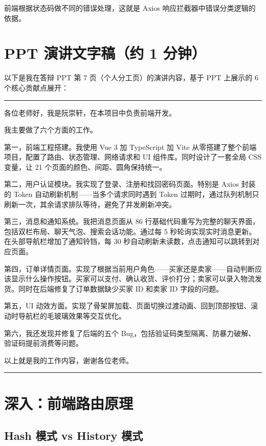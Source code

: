 \documentclass[12pt,a4paper]{ctexart}
\begin{document}
前端根据状态码做不同的错误处理，这就是 Axios 响应拦截器中错误分类逻辑的依据。

\section{PPT 演讲文字稿（约 1 分钟）}

以下是我在答辩 PPT 第 7 页（个人分工页）的演讲内容，基于 PPT 上展示的 6 个核心贡献点展开：

\medskip
\noindent\rule{\textwidth}{0.4pt}
\medskip

各位老师好，我是阮崇轩，在本项目中负责前端开发。

我主要做了六个方面的工作。

第一，前端工程搭建。我使用 Vue 3 加 TypeScript 加 Vite 从零搭建了整个前端项目，配置了路由、状态管理、网络请求和 UI 组件库。同时设计了一套全局 CSS 变量，让 21 个页面的颜色、间距、圆角保持统一。

第二，用户认证模块。我实现了登录、注册和找回密码页面。特别是 Axios 封装的 Token 自动刷新机制——当多个请求同时遇到 Token 过期时，通过队列机制只刷新一次，其余请求排队等待，避免了并发刷新冲突。

第三，消息和通知系统。我把消息页面从 86 行基础代码重写为完整的聊天界面，包括双栏布局、聊天气泡、搜索会话功能。通过每 5 秒轮询实现实时消息更新。在头部导航栏增加了通知铃铛，每 30 秒自动刷新未读数，点击通知可以跳转到对应页面。

第四，订单详情页面。实现了根据当前用户角色——买家还是卖家——自动判断应该显示什么操作按钮。买家可以支付、确认收货、评价打分；卖家可以录入物流发货。同时在后端修复了订单数据缺少买家 ID 和卖家 ID 字段的问题。

第五，UI 动效方面。实现了骨架屏加载、页面切换过渡动画、回到顶部按钮、滚动时导航栏的毛玻璃效果等交互优化。

第六，我还发现并修复了后端的五个 Bug，包括验证码类型隔离、防暴力破解、验证码提前消费等问题。

以上就是我的工作内容，谢谢各位老师。

\medskip
\noindent\rule{\textwidth}{0.4pt}
\medskip

\section{深入：前端路由原理}

\subsection{Hash 模式 vs History 模式}
\end{document}
